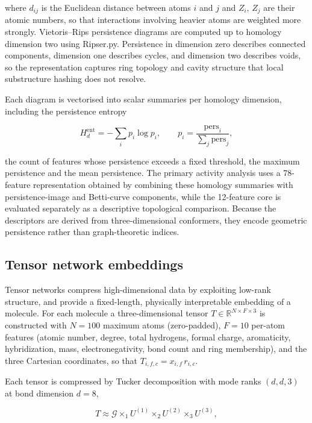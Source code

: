 where $d_{ij}$ is the Euclidean distance between atoms $i$ and $j$ and $Z_i$, $Z_j$ are their atomic numbers, so that interactions involving heavier atoms are weighted more strongly. Vietoris--Rips persistence diagrams are computed up to homology dimension two using Ripser.py. Persistence in dimension zero describes connected components, dimension one describes cycles, and dimension two describes voids, so the representation captures ring topology and cavity structure that local substructure hashing does not resolve.

Each diagram is vectorised into scalar summaries per homology dimension, including the persistence entropy

\begin{equation}
H_d^{\mathrm{ent}} = -\sum_i p_i \log p_i, \qquad p_i = \frac{\mathrm{pers}_i}{\sum_j \mathrm{pers}_j},
\end{equation}

the count of features whose persistence exceeds a fixed threshold, the maximum persistence and the mean persistence. The primary activity analysis uses a \num{78}-feature representation obtained by combining these homology summaries with persistence-image and Betti-curve components, while the \num{12}-feature core is evaluated separately as a descriptive topological comparison. Because the descriptors are derived from three-dimensional conformers, they encode geometric persistence rather than graph-theoretic indices.

\subsection{Tensor network embeddings}\label{sec:tne_methods}

Tensor networks compress high-dimensional data by exploiting low-rank structure, and provide a fixed-length, physically interpretable embedding of a molecule. For each molecule a three-dimensional tensor $T \in \mathbb{R}^{N \times F \times 3}$ is constructed with $N = \num{100}$ maximum atoms (zero-padded), $F = \num{10}$ per-atom features (atomic number, degree, total hydrogens, formal charge, aromaticity, hybridization, mass, electronegativity, bond count and ring membership), and the three Cartesian coordinates, so that $T_{i,f,c} = x_{i,f} \, r_{i,c}$.

Each tensor is compressed by Tucker decomposition with mode ranks $(d, d, 3)$ at bond dimension $d = \num{8}$,

\begin{equation}
T \approx \mathcal{G} \times_1 U^{(1)} \times_2 U^{(2)} \times_3 U^{(3)},
\end{equation}


